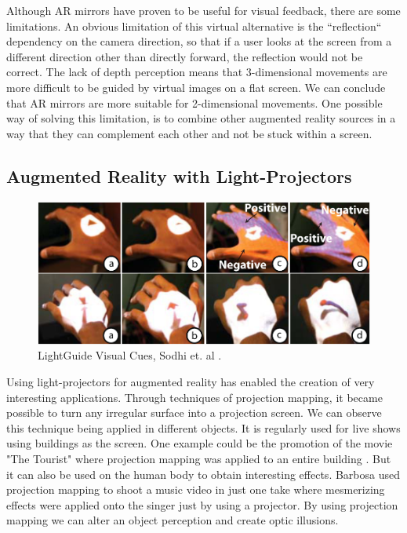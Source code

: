 Although \ac{AR} mirrors have proven to be useful for visual feedback, there are some limitations. 
An obvious limitation of this virtual alternative is the ``reflection`` dependency on the camera direction, 
so that if a user looks at the screen from a different direction
other than directly forward, the reflection would not be correct.
The lack of depth perception means that 3-dimensional movements are more difficult to be guided by virtual images on a flat screen. 
We can conclude that \ac{AR} mirrors are more suitable for 2-dimensional movements. One possible way of solving this limitation, 
is to combine other augmented reality sources in a way that they can complement each other and not be stuck within a screen.


\subsection{Augmented Reality with Light-Projectors}
\label{RW-projectionmapping}


\begin{figure}[!t]
    \begin{center}
        \includegraphics[width=\textwidth]{imgs/lightguide}
    \end{center}
    \caption{LightGuide Visual Cues, Sodhi et. al \cite{Sodhi2012}.}
    \label{fig:lightguide}
\end{figure}


Using light-projectors for augmented reality has enabled the creation of very interesting applications. 
Through techniques of projection mapping, it became possible to turn any irregular surface into a projection screen.
We can observe this technique being applied in different objects. It is regularly used for live shows 
using buildings as the screen. One example could be the promotion of the movie "The Tourist" where 
projection mapping was applied to an entire building \cite{projectionmapping_building}. But it can 
also be used on the human body to obtain interesting effects. Barbosa \cite{projectionmapping_face} 
used projection mapping to shoot a music video in just one take where mesmerizing effects were applied 
onto the singer just by using a projector. 
By using projection mapping we can alter an object perception and create optic illusions.

